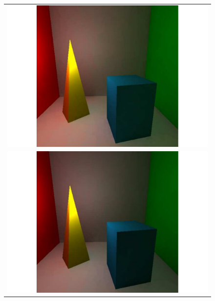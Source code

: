 \begin{figure}
\begin{center}
{\begin{tabular}{c}
\includegraphics*[scale=0.25]{imgs/pq_frame2.pdf}\\
\includegraphics*[scale=0.25]{imgs/pq_frame3.pdf}
\end{tabular}
}%
\end{center}
\end{figure}
